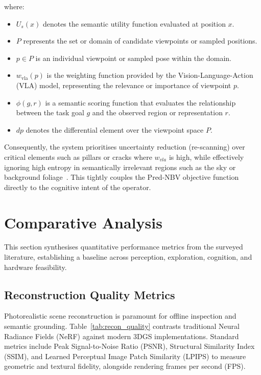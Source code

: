 \documentclass[conference]{IEEEtran}
\begin{document}
where:
\begin{itemize}
	\item $U_s(x)$ denotes the semantic utility function evaluated at position $x$.
	\item $P$ represents the set or domain of candidate viewpoints or sampled positions.
	\item $p \in P$ is an individual viewpoint or sampled pose within the domain.
	\item $w_{\text{vla}}(p)$ is the weighting function provided by the Vision-Language-Action (VLA) model, representing the relevance or importance of viewpoint $p$.
	\item $\phi(g,r)$ is a semantic scoring function that evaluates the relationship between the task goal $g$ and the observed region or representation $r$.
	\item $dp$ denotes the differential element over the viewpoint space $P$.
\end{itemize}

Consequently, the system prioritises uncertainty reduction (re-scanning) over critical elements such as pillars or cracks where $w_{vla}$ is high, while effectively ignoring high entropy in semantically irrelevant regions such as the sky or background foliage~\cite{bai2025qwen3vl}. This tightly couples the Pred-NBV objective function directly to the cognitive intent of the operator.

\section{Comparative Analysis}
\label{sec:comparative}

This section synthesises quantitative performance metrics from the surveyed literature, establishing a baseline across perception, exploration, cognition, and hardware feasibility.

\subsection{Reconstruction Quality Metrics}
\label{subsec:reconstruction_metrics}

Photorealistic scene reconstruction is paramount for offline inspection and semantic grounding. Table~\ref{tab:recon_quality} contrasts traditional Neural Radiance Fields (NeRF) against modern 3DGS implementations. Standard metrics include Peak Signal-to-Noise Ratio (PSNR), Structural Similarity Index (SSIM), and Learned Perceptual Image Patch Similarity (LPIPS) to measure geometric and textural fidelity, alongside rendering frames per second (FPS). 
\end{document}

